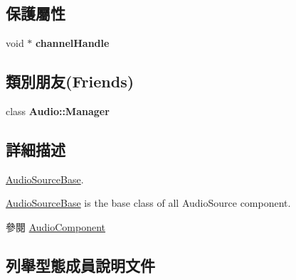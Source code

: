 \subsection*{保護屬性}
\begin{DoxyCompactItemize}
\item 
void $\ast$ {\bfseries channel\+Handle}\hypertarget{class_i_dream_sky_1_1_audio_source_base_a72165c7ea4c91e183ee80f759f3ce531}{}\label{class_i_dream_sky_1_1_audio_source_base_a72165c7ea4c91e183ee80f759f3ce531}

\end{DoxyCompactItemize}
\subsection*{類別朋友(Friends)}
\begin{DoxyCompactItemize}
\item 
class {\bfseries Audio\+::\+Manager}\hypertarget{class_i_dream_sky_1_1_audio_source_base_a3ad7b469f47b268897de410969c1c7cd}{}\label{class_i_dream_sky_1_1_audio_source_base_a3ad7b469f47b268897de410969c1c7cd}

\end{DoxyCompactItemize}


\subsection{詳細描述}
\hyperlink{class_i_dream_sky_1_1_audio_source_base}{Audio\+Source\+Base}. 

\hyperlink{class_i_dream_sky_1_1_audio_source_base}{Audio\+Source\+Base} is the base class of all Audio\+Source component. \begin{DoxySeeAlso}{參閱}
\hyperlink{class_i_dream_sky_1_1_audio_component}{Audio\+Component} 
\end{DoxySeeAlso}


\subsection{列舉型態成員說明文件}
